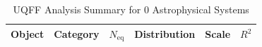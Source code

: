 
\begin{table}[ht]
\centering
\caption{UQFF Analysis Summary for 0 Astrophysical Systems}
\label{tab:uqff_batch_summary}
\begin{tabular}{llcccc}
\toprule
Object & Category & $N_{\mathrm{eq}}$ & Distribution & Scale & $R^2$ \\
\midrule
\bottomrule
\end{tabular}
\end{table}
